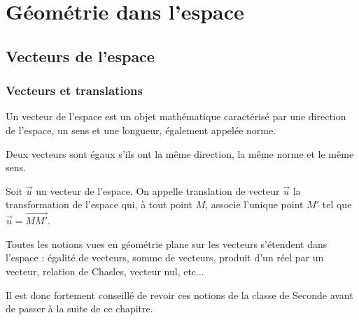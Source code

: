 \documentclass[11pt,fleqn, openany]{book} %
\begin{document}



\chapter{Géométrie dans l'espace}

\section{Vecteurs de l'espace}

\subsection{Vecteurs et translations}

\begin{definition}Un vecteur de l'espace est un objet mathématique caractérisé par une direction de l'espace, un sens et une longueur, également appelée norme.

Deux vecteurs sont égaux s'ils ont la même direction, la même norme et le même sens.\end{definition}

\begin{definition}Soit $\vec u$ un vecteur de l'espace. On appelle translation de vecteur $\vec u$ la transformation de l'espace qui, à tout point $M$, associe l'unique point $M'$ tel que $\vec u = \overrightarrow{MM'}$.\end{definition} 

Toutes les notions vues en géométrie plane sur les vecteurs s'étendent dans l'espace : égalité de vecteurs, somme de vecteurs, produit d'un réel par un vecteur, relation de Chasles, vecteur nul, etc...

Il est donc fortement conseillé de revoir ces notions de la classe de Seconde avant de passer à la suite de ce chapitre.
\end{document}
